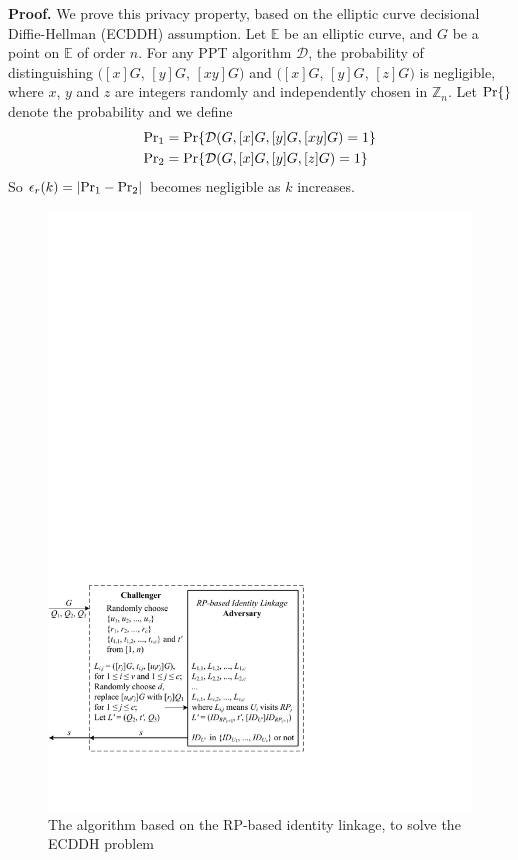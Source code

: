 {{\vspace{0.75mm}
\noindent\textbf{Proof.}
We prove this privacy property,
 based on the elliptic curve decisional Diffie-Hellman (ECDDH) assumption. %
%
Let $\mathbb{E}$ be an elliptic curve,
    and $G$ be a point on $\mathbb{E}$ of order $n$.
For any PPT algorithm $\mathcal{D}$, the probability of distinguishing
 $([x]G$, $[y]G$, $[xy]G)$ and $([x]G$, $[y]G$, $[z]G)$
is negligible,
 where $x$, $y$ and $z$ are integers randomly and independently chosen in $\mathbb{Z}_n$.
Let  ${\rm Pr}\{\}$ denote the probability and
 we define
\begin{align*}
&{\rm Pr}_1 =  {\rm Pr}\{\mathcal{D}(G, [x]G, [y]G, [xy]G)=1\} \\
&{\rm Pr}_2 =  {\rm Pr}\{\mathcal{D}(G, [x]G, [y]G, [z]G)=1\}
\end{align*}
So $\epsilon_{r}(k) = |{\rm Pr}_1 - {\rm Pr}_2|$ becomes negligible as $k$ increases.

\begin{figure}[tb]
  \centering
  \includegraphics[width=0.97\linewidth]{fig/dalgorithm.pdf}
  \caption{The algorithm based on the RP-based identity linkage, to solve the ECDDH problem}
  \label{fig:dalgorithm}
\end{figure}

}}
